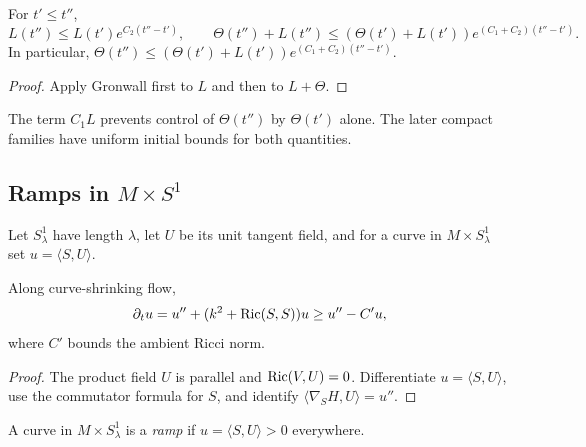 \begin{corollary}
\label{cor:curve-shrinking-length-curvature-exponential-bound}
\label{lncurvgrowth}


For $t'\le t''$,
\[
L(t'')\le L(t')e^{C_2(t''-t')},
\qquad
\Theta(t'')+L(t'')\le(\Theta(t')+L(t'))e^{(C_1+C_2)(t''-t')}.
\]
In particular,
$\Theta(t'')\le(\Theta(t')+L(t'))e^{(C_1+C_2)(t''-t')}$.
\end{corollary}
\begin{proof}
\sketch Apply Gronwall first to $L$ and then to $L+\Theta$.
\end{proof}

\begin{remark}
\label{rem:total-curvature-needs-initial-length}

The term $C_1L$ prevents control of $\Theta(t'')$ by $\Theta(t')$ alone. The
later compact families have uniform initial bounds for both quantities.
\end{remark}

\subsection{Ramps in $M\times S^1$}

Let $S^1_\lambda$ have length $\lambda$, let $U$ be its unit tangent field,
and for a curve in $M\times S^1_\lambda$ set $u=\langle S,U\rangle$.

\begin{claim}
\label{claim:ramp-function-evolution}
\label{rampcomp}
Along curve-shrinking flow,
\[
\partial_tu=u''+(k^2+\operatorname{Ric}(S,S))u\ge u''-C'u,
\]
where $C'$ bounds the ambient Ricci norm.
\end{claim}
\begin{proof}
\sketch The product field $U$ is parallel and $\operatorname{Ric}(V,U)=0$. Differentiate
$u=\langle S,U\rangle$, use the commutator formula for $S$, and identify
$\langle\nabla_SH,U\rangle=u''$.
\end{proof}

\begin{definition}[Ramp]
\label{def:ramp-curve}
A curve in $M\times S^1_\lambda$ is a \emph{ramp} if
$u=\langle S,U\rangle>0$ everywhere.
\end{definition}

